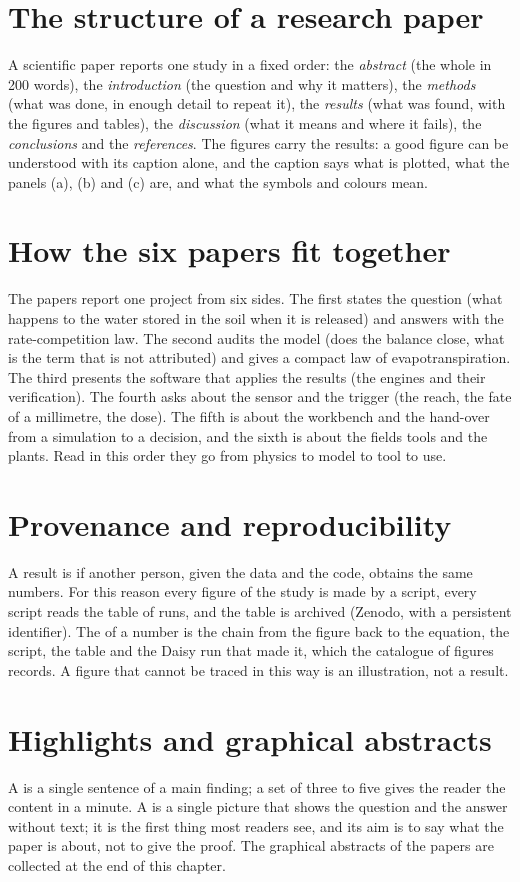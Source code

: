\section{The structure of a research paper}
A scientific paper reports one study in a fixed order: the \emph{abstract} (the whole in 200 words), the \emph{introduction} (the question and why it matters), the \emph{methods} (what was done, in enough detail to repeat it), the \emph{results} (what was found, with the figures and tables), the \emph{discussion} (what it means and where it fails), the \emph{conclusions} and the \emph{references}. The figures carry the results: a good figure can be understood with its caption alone, and the caption says what is plotted, what the panels (a), (b) and (c) are, and what the symbols and colours mean.

\section{How the six papers fit together}
The papers report one project from six sides. The first states the question (what happens to the water stored in the soil when it is released) and answers with the rate-competition law. The second audits the model (does the balance close, what is the term that is not attributed) and gives a compact law of evapotranspiration. The third presents the software that applies the results (the engines and their verification). The fourth asks about the sensor and the trigger (the reach, the fate of a millimetre, the dose). The fifth is about the workbench and the hand-over from a simulation to a decision, and the sixth is about the fields tools and the plants. Read in this order they go from physics to model to tool to use.

\section{Provenance and reproducibility}
A result is  if another person, given the data and the code, obtains the same numbers. For this reason every figure of the study is made by a script, every script reads the table of runs, and the table is archived (Zenodo, with a persistent identifier). The  of a number is the chain from the figure back to the equation, the script, the table and the Daisy run that made it, which the catalogue of figures records. A figure that cannot be traced in this way is an illustration, not a result.

\section{Highlights and graphical abstracts}
A  is a single sentence of a main finding; a set of three to five gives the reader the content in a minute. A  is a single picture that shows the question and the answer without text; it is the first thing most readers see, and its aim is to say what the paper is about, not to give the proof. The graphical abstracts of the papers are collected at the end of this chapter.
